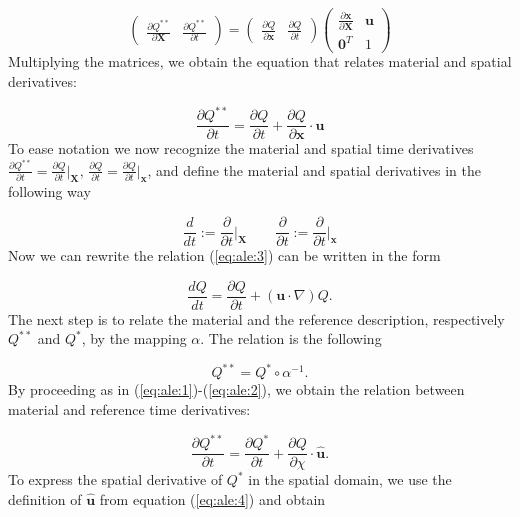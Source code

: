 \documentclass[a4paper,11pt,oneside]{book}
\begin{document}
\begin{equation}
\label{eq:ale:2}
\begin{pmatrix}
\frac{\partial Q^{**}}{\partial \mathbf{X}} & \frac{\partial Q^{**}}{\partial t}
\end{pmatrix} = 
\begin{pmatrix}
\frac{\partial Q}{\partial \mathbf{x}} & \frac{\partial Q}{\partial t}
\end{pmatrix}
\begin{pmatrix}
\frac{\partial \mathbf{x}}{\partial \mathbf{X}} & \mathbf{u}\\
\mathbf{0}^T & 1
\end{pmatrix} 
\end{equation}
Multiplying the matrices, we obtain the equation that relates material and spatial derivatives:

\begin{equation}
\label{eq:ale:3}
\frac{\partial Q^{**}}{\partial t} = \frac{\partial Q}{\partial t}
+ \frac{\partial Q}{\partial \mathbf{x}} \cdot \mathbf{u}
\end{equation}
To ease notation we now recognize the material and spatial time derivatives $\frac{\partial Q^{**}}{\partial t} = \frac{\partial Q}{\partial t} {\Big |}_\mathbf{X}, \,  \frac{\partial Q}{\partial t} = \frac{\partial Q}{\partial t} {\Big |}_\mathbf{x}$, and define the material and spatial derivatives in the following way

\begin{equation}
\frac{d}{dt} := 	\frac{\partial}{\partial t} {\Big |}_\mathbf{X} \qquad
\frac{\partial}{\partial t} := \frac{\partial}{\partial t} {\Big |}_\mathbf{x}
\end{equation}
Now we can rewrite the relation (\ref{eq:ale:3}) can be written in the form

\begin{equation}
\label{eq:ale:6}
\frac{d Q}{d t} = \frac{\partial Q}{\partial t} + (\mathbf{u} \cdot \nabla) Q.
\end{equation}
The next step is to relate the material and the reference description, respectively $Q^{**}$ and $Q^{*}$, by the mapping $\alpha$. The relation is the following

\begin{equation}
Q^{**} = Q^{*} \circ \alpha^{-1}.
\end{equation}
By proceeding as in (\ref{eq:ale:1})-(\ref{eq:ale:2}), we obtain the relation between material and reference time derivatives:

\begin{equation}
\label{eq:ale:3}
\frac{\partial Q^{**}}{\partial t} = \frac{\partial Q^{*}}{\partial t}
+ \frac{\partial Q}{\partial \chi} \cdot \hat{\mathbf{u}}.
\end{equation}
To express the spatial derivative of $Q^{*}$ in the spatial domain, we use the definition of $\hat{\mathbf{u}}$ from equation (\ref{eq:ale:4}) and obtain
\end{document}
